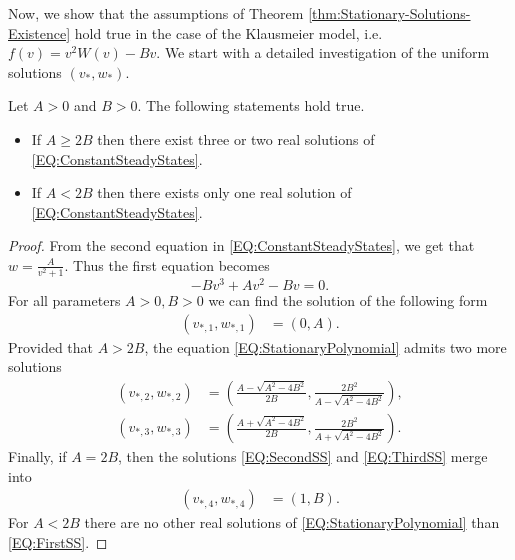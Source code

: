 \documentclass[review,onefignum,onetabnum]{SIAM-styles/siamart171218}
\begin{document}
Now, we show that the assumptions of Theorem \ref{thm:Stationary-Solutions-Existence} hold true in the case of the Klausmeier model, i.e.\ $f(v) = v^2W(v) - Bv$. We start with a detailed investigation of the uniform solutions $(v_*, w_*)$.

\begin{prp}
    \label{prp:ExistenceOfConstantSSKineticSystem}
    Let $A > 0$ and $B > 0$. The following statements hold true.
    \begin{itemize}
        \item If $A \geq 2B$ then there exist three or two real solutions of \eqref{EQ:ConstantSteadyStates}.
        \item If $A < 2B$ then there exists only one real solution of \eqref{EQ:ConstantSteadyStates}.
    \end{itemize}
\end{prp}

\begin{proof}
    From the second equation in \eqref{EQ:ConstantSteadyStates}, we get that $w = \frac{A}{v^2 + 1}$. Thus the first equation becomes
    \begin{equation}
        \label{EQ:StationaryPolynomial}
        -B v^3 + A v^2 - B v = 0.
    \end{equation}
    For all parameters $A > 0, B > 0$ we can find the solution of the following form
    \begin{align}
        \label{EQ:FirstSS}
        \left(v_{*,1}, w_{*,1}\right) &= \left(0, A\right).
    \end{align}
    Provided that $A > 2B$, the equation \eqref{EQ:StationaryPolynomial} admits two more solutions
    \begin{align}
        \left(v_{*,2}, w_{*,2}\right) &= \left(\frac{A - \sqrt{A^2 - 4B^2}}{2B}, \frac{2 B^2}{A - \sqrt{A^2 - 4B^2}}\right), \label{EQ:SecondSS}\\
        \left(v_{*,3}, w_{*,3}\right) &= \left(\frac{A + \sqrt{A^2 - 4B^2}}{2B}, \frac{2 B^2}{A + \sqrt{A^2 - 4B^2}}\right). \label{EQ:ThirdSS}
    \end{align}
    Finally, if $A = 2B$, then the solutions \eqref{EQ:SecondSS} and \eqref{EQ:ThirdSS} merge into 
    \begin{align}
        \label{EQ:FourthSS}
        \left( v_{*,4}, w_{*,4} \right) &= \left(1, B\right).
    \end{align}
    For $A < 2B$ there are no other real solutions of \eqref{EQ:StationaryPolynomial} than \eqref{EQ:FirstSS}.
\end{proof}
\end{document}
